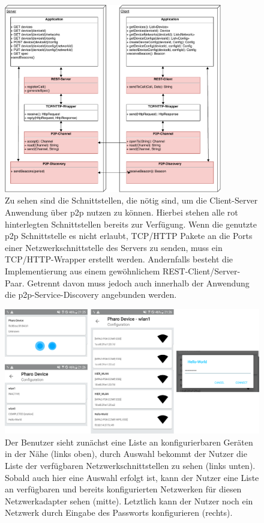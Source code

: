 \documentclass[12pt,a4paper]{article}
\begin{document}
	\begin{figure}[ht]
		\centering
	    \includegraphics[width=0.85\textwidth]{IOT-Connectivity-Protocol-Stack}
    	\caption{Zu sehen sind die Schnittstellen, die nötig sind, um die Client-Server Anwendung über p2p nutzen zu können. Hierbei stehen alle rot hinterlegten Schnittstellen bereits zur Verfügung. Wenn die genutzte p2p Schnittstelle es nicht erlaubt, TCP/HTTP Pakete an die Ports einer Netzwerkschnittstelle des Servers zu senden, muss ein TCP/HTTP-Wrapper erstellt werden. Andernfalls besteht die Implementierung aus einem gewöhnlichem REST-Client/Server-Paar. Getrennt davon muss jedoch auch innerhalb der Anwendung die p2p-Service-Discovery angebunden werden. }
	    \label{protocol_stack}
	\end{figure}     
    
    
    
    \begin{figure}[ht]
		\centering
	    \includegraphics[width=1.0\textwidth]{user_flow.png}
    	\caption{ Der Benutzer sieht zunächst eine Liste an konfigurierbaren Geräten in der Nähe (links oben), durch Auswahl bekommt der Nutzer die Liste der verfügbaren Netzwerkschnittstellen zu sehen (links unten). Sobald auch hier eine Auswahl erfolgt ist, kann der Nutzer eine Liste an verfügbaren und bereits konfigurierten Netzwerken für diesen Netzwerkadapter sehen (mitte). Letztlich kann der Nutzer noch ein Netzwerk durch Eingabe des Passworts konfigurieren (rechts). }
	    \label{user_flow}
	\end{figure}
	
\end{document}
